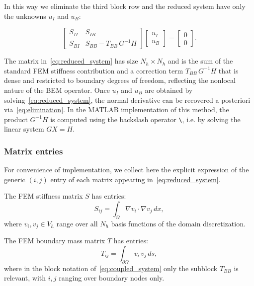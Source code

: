 \documentclass[11pt,onecolumn]{article}
\begin{document}
In this way we eliminate the third block row and the reduced system have only the unknowns $u_I$ and $u_B$:

\begin{equation}
\begin{bmatrix}
S_{II} & S_{IB} \\
S_{BI} & S_{BB} - T_{BB}\, G^{-1}H
\end{bmatrix}
\begin{bmatrix}
u_I \\ u_B
\end{bmatrix}
=
\begin{bmatrix}
0 \\ 0
\end{bmatrix}.
\label{eq:reduced_system}
\end{equation}

The matrix in~\eqref{eq:reduced_system} has size $N_h \times N_h$ and is the sum of the standard FEM stiffness contribution and a correction term $T_{BB}\, G^{-1}H$ that is dense and restricted to boundary degrees of freedom, reflecting the nonlocal nature of the BEM operator. Once $u_I$ and $u_B$ are obtained by solving~\eqref{eq:reduced_system}, the normal derivative can be recovered a posteriori via~\eqref{eq:elimination}.
{\color{cyan} In the MATLAB implementation of this method, the product $G^{-1}H$ is computed using the backslash operator \texttt{\textbackslash}, i.e. by solving the linear system $GX = H$.}


\subsubsection{Matrix entries}

For convenience of implementation, we collect here the explicit expression of the generic $(i,j)$ entry of each matrix appearing in~\eqref{eq:reduced_system}.

The FEM stiffness matrix $S$ has entries:
\begin{equation}
S_{ij} = \int_{\Omega} \nabla v_i \cdot \nabla v_j \, dx,
\end{equation}
where $v_i, v_j \in V_h$ range over all $N_h$ basis functions of the domain discretization.

The FEM boundary mass matrix $T$ has entries:
\begin{equation}
T_{ij} = \int_{\partial\Omega} v_i\, v_j \, ds,
\end{equation}
where in the block notation of~\eqref{eq:coupled_system} only the subblock $T_{BB}$ is relevant, with $i,j$ ranging over boundary nodes only.
\end{document}
